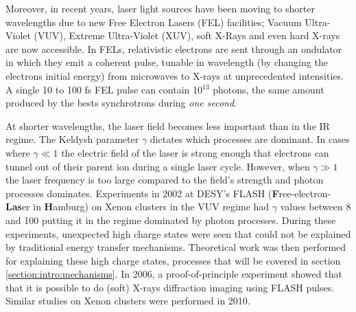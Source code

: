 Moreover, in recent years, laser light sources
have been moving to shorter wavelengths due to new Free Electron Lasers (FEL)
facilities; Vacuum Ultra-Violet (VUV), Extreme Ultra-Violet (XUV), soft X-Rays
and even hard X-rays are now accessible. In FELs, relativistic electrons are sent
through an ondulator in which they emit a coherent pulse, tunable in wavelength
(by changing the electrons initial energy)
from microwaves to X-rays\cite{Brabec2009,Ackermann2007a,Pellegrini2012} at
unprecedented intensities. A single 10 to 100 fs FEL pulse can contain 10$^{13}$
photons, the same amount produced by the bests synchrotrons during
\textit{one second}\cite{Bostedt2009}.

At shorter wavelengths, the laser field becomes less important than in the IR
regime. The Keldysh parameter $\gamma$ dictates which processes are dominant. In
cases where $\gamma \ll 1$ the electric field of the laser is strong enough that
electrons can tunnel out of their parent ion during a single laser cycle.
However, when $\gamma \gg 1$ the laser frequency is too large compared to the
field's strength and photon processes dominates. Experiments in 2002\cite{Wabnitz2002} at
DESY's FLASH (\textbf{F}ree-electron-\textbf{Las}er in \textbf{H}amburg)\cite{Bostedt2009}
on Xenon clusters in the VUV regime had $\gamma$ values between 8 and
100 putting it in the regime dominated by photon processes.
During these experiments, unexpected high charge states were seen that could not
be explained by traditional energy transfer mechanisms. Theoretical work was
then performed for explaining these high charge states, processes that will be
covered in section \ref{section:intro:mechanisms}.
In 2006, a proof-of-principle experiment showed that that it is possible to
do (soft) X-rays diffraction imaging using FLASH pulses\cite{Chapman2006}.
Similar studies on Xenon clusters were performed in 2010\cite{Bostedt2010}.

